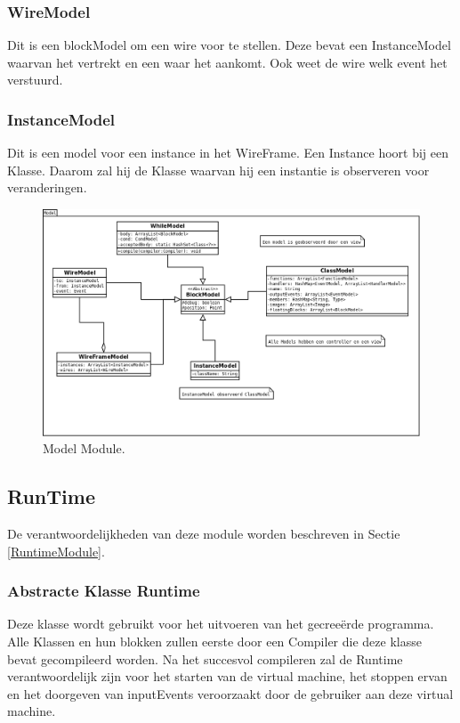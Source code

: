 \documentclass[]{article}
\begin{document}
\subsubsection{WireModel}
Dit is een blockModel om een wire voor te stellen. Deze bevat een InstanceModel waarvan het vertrekt en een waar het aankomt. Ook weet de wire welk event het verstuurd.
\subsubsection{InstanceModel}
Dit is een model voor een instance in het WireFrame. Een Instance hoort bij een Klasse. Daarom zal hij de Klasse waarvan hij een instantie is observeren voor veranderingen.

\clearpage
 \begin{figure}
  \centering
   
\includegraphics[scale=0.8]{./AnalyseClassenDiagram/model.png}
  \caption{Model Module.} \label{modelUML}
\end{figure}
\clearpage

\subsection{RunTime}
De verantwoordelijkheden van deze module worden beschreven in Sectie \ref{RuntimeModule}.
\subsubsection{Abstracte Klasse Runtime}
Deze klasse wordt gebruikt voor het uitvoeren van het gecree\"{e}rde programma. Alle Klassen en hun blokken zullen eerste door een Compiler die deze klasse bevat gecompileerd worden. Na het succesvol compileren zal de Runtime verantwoordelijk zijn voor het starten van de virtual machine, het stoppen ervan en het doorgeven van inputEvents veroorzaakt door de gebruiker aan deze virtual machine.
\end{document}
